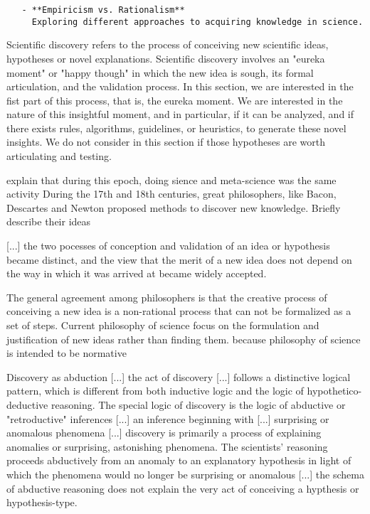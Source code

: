 \begin{verbatim}
   - **Empiricism vs. Rationalism**  
     Exploring different approaches to acquiring knowledge in science.
\end{verbatim}

Scientific discovery refers to the process of conceiving new scientific ideas, hypotheses or novel explanations. Scientific discovery involves an "eureka moment" or "happy though" in which the new idea is sough, its formal articulation, and the validation process. In this section, we are interested in the fist part of this process, that is, the eureka moment. We are interested in the nature of this insightful moment, and in particular, if it can be analyzed, and if there exists rules, algorithms, guidelines, or heuristics, to generate these novel insights. We do not consider in this section if those hypotheses are worth articulating and testing.

{\color{red} explain that during this epoch, doing sience and meta-science was the same activity} During the 17th and 18th centuries, great philosophers, like Bacon, Descartes and Newton proposed methods to discover new knowledge. {\color{red} Briefly describe their ideas}

{\color{red} [...] the two pocesses of conception and validation of an idea or hypothesis became distinct, and the view that the merit of a new idea does not depend on the way in which it was arrived at became widely accepted.} 

The general agreement among philosophers is that the creative process of conceiving a new idea is a non-rational process that can not be formalized as a set of steps. Current philosophy of science focus on the formulation and justification of new ideas rather than finding them. {\color{red} because philosophy of science is intended to be normative}

{\color{red} Discovery as abduction [...] the act of discovery [...] follows a distinctive logical pattern, which is different from both inductive logic and the logic of hypothetico-deductive reasoning. The special logic of discovery is the logic of abductive or "retroductive" inferences [...] an inference beginning with [...] surprising or anomalous phenomena [...] discovery is primarily a process of explaining anomalies or surprising, astonishing phenomena. The scientists' reasoning proceeds abductively from an anomaly to an explanatory hypothesis in light of which the phenomena would no longer be surprising or anomalous [...] the schema of abductive reasoning does not explain the very act of conceiving a hypthesis or hypothesis-type.}

